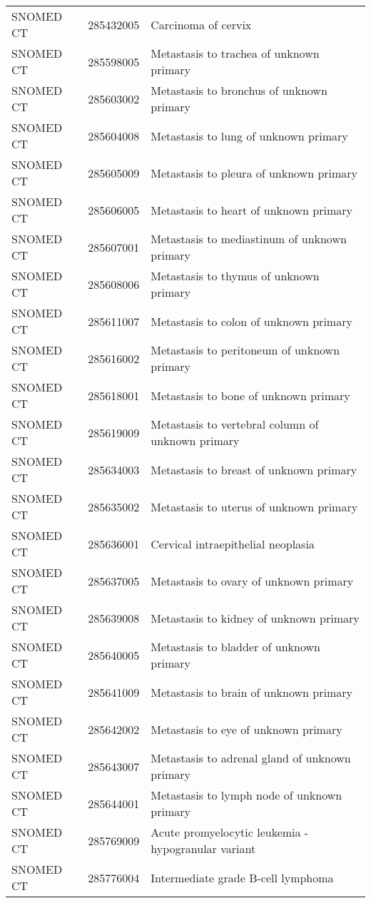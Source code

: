 \begin{longtable}{p{}p{}p{}}
  SNOMED CT & 285432005 & Carcinoma of cervix \\ 
  SNOMED CT & 285598005 & Metastasis to trachea of unknown primary \\ 
  SNOMED CT & 285603002 & Metastasis to bronchus of unknown primary \\ 
  SNOMED CT & 285604008 & Metastasis to lung of unknown primary \\ 
  SNOMED CT & 285605009 & Metastasis to pleura of unknown primary \\ 
  SNOMED CT & 285606005 & Metastasis to heart of unknown primary \\ 
  SNOMED CT & 285607001 & Metastasis to mediastinum of unknown primary \\ 
  SNOMED CT & 285608006 & Metastasis to thymus of unknown primary \\ 
  SNOMED CT & 285611007 & Metastasis to colon of unknown primary \\ 
  SNOMED CT & 285616002 & Metastasis to peritoneum of unknown primary \\ 
  SNOMED CT & 285618001 & Metastasis to bone of unknown primary \\ 
  SNOMED CT & 285619009 & Metastasis to vertebral column of unknown primary \\ 
  SNOMED CT & 285634003 & Metastasis to breast of unknown primary \\ 
  SNOMED CT & 285635002 & Metastasis to uterus of unknown primary \\ 
  SNOMED CT & 285636001 & Cervical intraepithelial neoplasia \\ 
  SNOMED CT & 285637005 & Metastasis to ovary of unknown primary \\ 
  SNOMED CT & 285639008 & Metastasis to kidney of unknown primary \\ 
  SNOMED CT & 285640005 & Metastasis to bladder of unknown primary \\ 
  SNOMED CT & 285641009 & Metastasis to brain of unknown primary \\ 
  SNOMED CT & 285642002 & Metastasis to eye of unknown primary \\ 
  SNOMED CT & 285643007 & Metastasis to adrenal gland of unknown primary \\ 
  SNOMED CT & 285644001 & Metastasis to lymph node of unknown primary \\ 
  SNOMED CT & 285769009 & Acute promyelocytic leukemia - hypogranular variant \\ 
  SNOMED CT & 285776004 & Intermediate grade B-cell lymphoma \\ 

\end{longtable}
